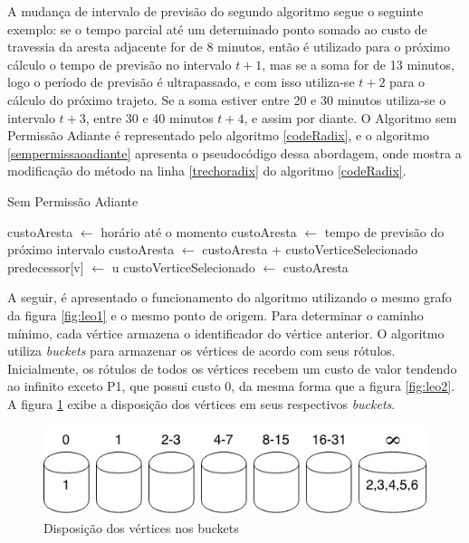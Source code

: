 A mudança de intervalo de previsão do segundo algoritmo segue o seguinte exemplo: se o tempo parcial até um determinado 
ponto somado ao custo de travessia da aresta adjacente for de 8 minutos, então é utilizado para o próximo cálculo o tempo
de previsão no intervalo $t + 1$, mas se a soma for de 13 minutos, logo o período de previsão é ultrapassado, e com isso
utiliza-se $t + 2$ para o cálculo do próximo trajeto. Se a soma estiver entre 20 e 30 minutos utiliza-se o intervalo
$t + 3$, entre 30 e 40 minutos $t + 4$, e assim por diante.
O Algoritmo sem Permissão Adiante é representado pelo algoritmo \ref{codeRadix}, e o algoritmo \ref{sempermissaoadiante}
apresenta o pseudocódigo dessa abordagem, onde mostra a modificação do método na linha \ref{trechoradix} do
algoritmo \ref{codeRadix}.

\begin{algorithm}
\caption{Sem Permissão Adiante}
\begin{algorithmic}[1]
\State custoAresta $\leftarrow$ horário até o momento
  \State custoAresta $\leftarrow$ tempo de previsão do próximo intervalo
\EndIf
{}
  \State custoAresta $\leftarrow$ custoAresta + custoVerticeSelecionado
  \State predecessor[v] $\leftarrow$ u
\EndIf
\State custoVerticeSelecionado $\leftarrow$ custoAresta
\end{algorithmic}
\label{sempermissaoadiante}
\end{algorithm}
\FloatBarrier

A seguir, é apresentado o funcionamento do algoritmo utilizando o mesmo grafo da figura \ref{fig:leo1}
e o mesmo ponto de origem. Para determinar o caminho mínimo, cada vértice armazena o identificador do vértice anterior.
O algoritmo utiliza \textit{buckets} para armazenar os vértices de acordo com seus rótulos.
Inicialmente, os rótulos de todos os vértices recebem um custo de valor tendendo ao infinito exceto P1,
que possui custo 0, da mesma forma que a figura \ref{fig:leo2}. A figura \ref{fig:buckets} exibe a disposição dos vértices em seus
respectivos \textit{buckets}.

\begin{figure}[htbp]
\centering
 \includegraphics[width=.50\textwidth]{chapters/fig/buckets.png}
\caption{Disposição dos vértices nos buckets}
\label{fig:buckets}
\end{figure}
\FloatBarrier

